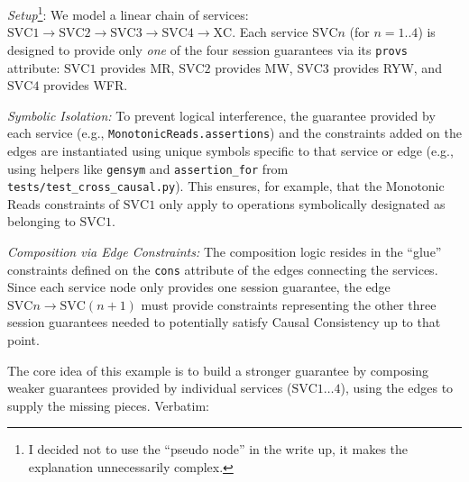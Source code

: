 \textit{Setup}\footnote{I decided not to use the ``pseudo node'' in
the write up, it makes the explanation unnecessarily complex.}: We
model a linear chain of services: $\text{SVC1} \rightarrow
\text{SVC2} \rightarrow \text{SVC3} \rightarrow \text{SVC4}
\rightarrow \text{XC}$.
Each service $\text{SVC}n$ (for $n=1..4$) is designed to provide only
\textit{one} of the
four session guarantees via its \texttt{provs} attribute:
$\text{SVC}1$ provides MR, $\text{SVC}2$ provides
MW, $\text{SVC}3$ provides RYW, and $\text{SVC}4$ provides WFR.

\textit{Symbolic Isolation:} To prevent logical interference, the
guarantee provided by
each service (e.g., \texttt{MonotonicReads.assertions}) and the
constraints added on
the edges are instantiated using unique symbols specific to that service or edge
(e.g., using helpers like \texttt{gensym} and \texttt{assertion\_for}
from \texttt{tests/test\_cross\_causal.py}).
This ensures, for example, that the Monotonic Reads constraints of
$\text{SVC}1$ only
apply to operations symbolically designated as belonging to $\text{SVC}1$.

\textit{Composition via Edge Constraints:} The composition logic
resides in the ``glue''
constraints defined on the \texttt{cons} attribute of the edges connecting the
services. Since each service node only provides one session
guarantee, the edge $\text{SVC}n \rightarrow \text{SVC}(n+1)$ must
provide constraints representing the other three session guarantees needed to
potentially satisfy Causal Consistency up to that point.

The core idea of this example is to build a stronger guarantee by composing
weaker guarantees provided by individual services ($\text{SVC}1
\ldots 4$), using the
edges to supply the missing pieces. Verbatim:

